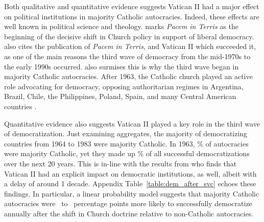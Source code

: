 \documentclass[12pt]{article}
\numberwithin{equation}{section}
\begin{document}
\label{par:pol_cond_eff_beg}
Both qualitative and quantitative evidence suggests Vatican II had a major effect on political institutions in majority Catholic autocracies. Indeed, these effects are well known in political science and theology. \cite{Sigmund1987} marks \emph{Pacem in Terris} as the beginning of the decisive shift in Church policy in support of liberal democracy. \cite{Huntington1991} also cites the publication of \textit{Pacem in Terris}, and Vatican II which succeeded it, as one of the main reasons the third wave of democracy from the mid-1970s to the early 1990s occurred. \citeauthor{Huntington1991} also surmises this is why the third wave began in majority Catholic autocracies. After 1963, the Catholic church played an active role advocating for democracy, opposing authoritarian regimes in Argentina, Brazil, Chile, the Philippines, Poland, Spain, and many Central American countries \citep{Huntington1991,Fukuyama1992,Andersen2019}.

Quantitative evidence also suggests Vatican II played a key role in the third wave of democratization. Just examining aggregates, the majority of democratizing countries from 1964 to 1983 were majority Catholic. In 1963, \pctAutMajCatholic\% of autocracies were majority Catholic, yet they made up \pctMajCatholicSucc\% of all successful democratizations over the next 20 years. This is in-line with the results from \cite{Andersen2019} who finds that Vatican II had an explicit impact on democratic institutions, as well, albeit with a delay of around 1 decade. Appendix Table~\ref{table:dem_after_svc} echoes these findings. In particular, a linear probability model suggests that majority Catholic autocracies were \tabCSevenSuccLow\ to \tabCSevenSuccHigh\ percentage points more likely to successfully democratize annually after the shift in Church doctrine relative to non-Catholic autocracies.
\end{document}
